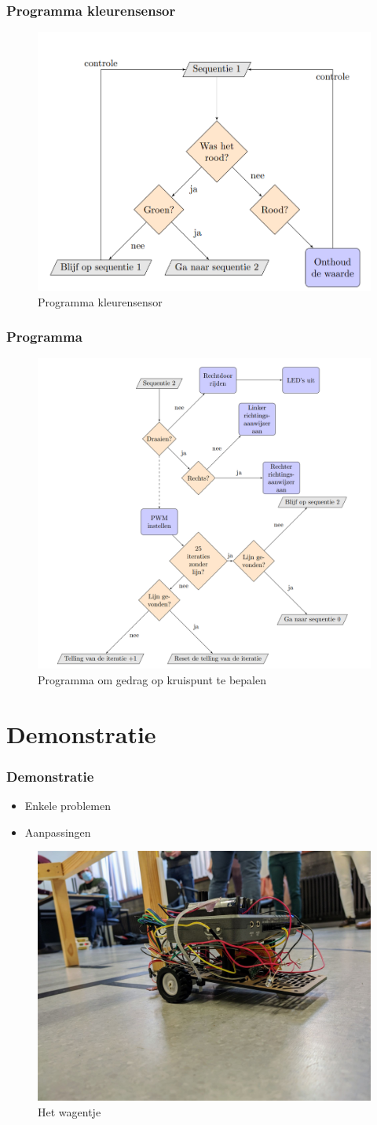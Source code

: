 \documentclass
   [kulak,aspectratio=169,<options>] %
   {kulakbeamer}
\begin{document}
\begin{frame}
	\frametitle{Programma kleurensensor}
	\begin{figure}
		\centering
		\includegraphics[width=.5\textwidth]{flowchart_sequentie1}
		\caption{Programma kleurensensor}
	\end{figure}
\end{frame}

\begin{frame}
	\frametitle{Programma}
	\begin{figure}
		\centering
		\includegraphics[width=.4\textwidth]{flowchart_grootProgramma}
		\caption{Programma om gedrag op kruispunt te bepalen}
	\end{figure}
\end{frame}


\section{Demonstratie}

\begin{frame}
	\frametitle{Demonstratie}
	\begin{itemize}
		\item Enkele problemen
		\item Aanpassingen
	\end{itemize}
	\begin{figure}
		\centering
		\includegraphics[width=.4\textwidth]{fotowagen}
		\caption{Het wagentje}
	\end{figure}
\end{frame}
\end{document}
